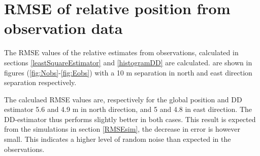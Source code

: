 \section{RMSE of relative position from observation data}\label{RMSEsection}
The RMSE values of the relative estimates from observations, calculated in sections \ref{leastSquareEstimator} and \ref{histogramDD} are calculated. are shown in figures (\ref{fig:Nobs}-\ref{fig:Eobs}) with a 10 m separation in north and east direction separation respectively. 
\par 
The calculaed RMSE values are, respectively for the global position and DD estimator 5.6 and 4.9 m in north direction, and 5 and 4.8 in east direction. The DD-estimator thus performs slightly better in both cases. This result is expected from the simulations in section \ref{RMSEsim}, the decrease in error is however small. This indicates a higher level of random noise than expected in the observations.
